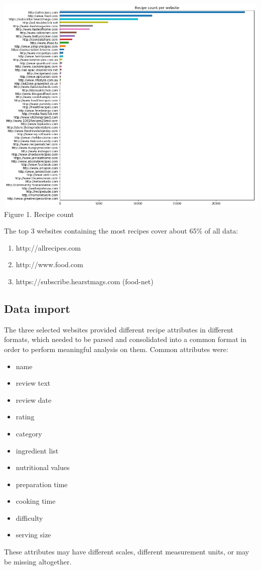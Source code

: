 \documentclass[11pt]{article}
\begin{document}
\vspace{5mm}
\begin{center}
\includegraphics[scale=0.22]{website-count}
\label{website-count} Figure 1. Recipe count
\end{center}
\vspace{5mm}

The top 3 websites containing the most recipes cover about 65\% of all data: 
\begin{enumerate}\itemsep0em
    \item http://allrecipes.com
    \item http://www.food.com
    \item https://subscribe.hearstmags.com (food-net)
\end{enumerate}

\subsection{Data import}

The three selected websites provided different recipe attributes in different formats, which needed to be parsed and consolidated into a common format in order to perform meaningful analysis on them.
Common attributes were:
\begin{itemize}\itemsep0em
    \item name
    \item review text
    \item review date
    \item rating
    \item category
    \item ingredient list
    \item nutritional values
    \item preparation time
    \item cooking time
    \item difficulty
    \item serving size
\end{itemize}
These attributes may have different scales, different measurement units, or may be missing altogether. 
\end{document}
